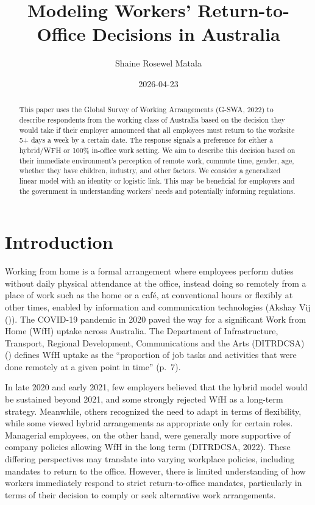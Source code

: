 \documentclass[
  a4paper,
]{article}
\title{Modeling Workers' Return-to-Office Decisions in Australia}
\author{Shaine Rosewel Matala}
\date{2026-04-23}
\numberwithin{equation}{section}
\numberwithin{figure}{section}
\numberwithin{table}{section}
\begin{document}
\maketitle
\begin{abstract}
This paper uses the Global Survey of Working Arrangements (G-SWA, 2022) to describe respondents from the working class of Australia based on the decision they would take if their employer announced that all employees must return to the worksite 5+ days a week by a certain date. The response signals a preference for either a hybrid/WFH or 100\% in-office work setting. We aim to describe this decision based on their immediate environment's perception of remote work, commute time, gender, age, whether they have children, industry, and other factors. We consider a generalized linear model with an identity or logistic link. This may be beneficial for employers and the government in understanding workers' needs and potentially informing regulations.
\end{abstract}

\section{Introduction}\label{sec:intro}

Working from home is a formal arrangement where employees perform duties without daily physical attendance at the office, instead doing so remotely from a place of work such as the home or a café, at conventional hours or flexibly at other times, enabled by information and communication technologies (Akshay Vij ()). The COVID-19 pandemic in 2020 paved the way for a significant Work from Home (WfH) uptake across Australia. The Department of Infrastructure, Transport, Regional Development, Communications and the Arts (DITRDCSA) () defines WfH uptake as the ``proportion of job tasks and activities that were done remotely at a given point in time'' (p.~7).

In late 2020 and early 2021, few employers believed that the hybrid model would be sustained beyond 2021, and some strongly rejected WfH as a long-term strategy. Meanwhile, others recognized the need to adapt in terms of flexibility, while some viewed hybrid arrangements as appropriate only for certain roles. Managerial employees, on the other hand, were generally more supportive of company policies allowing WfH in the long term (DITRDCSA, 2022). These differing perspectives may translate into varying workplace policies, including mandates to return to the office. However, there is limited understanding of how workers immediately respond to strict return-to-office mandates, particularly in terms of their decision to comply or seek alternative work arrangements.
\end{document}
